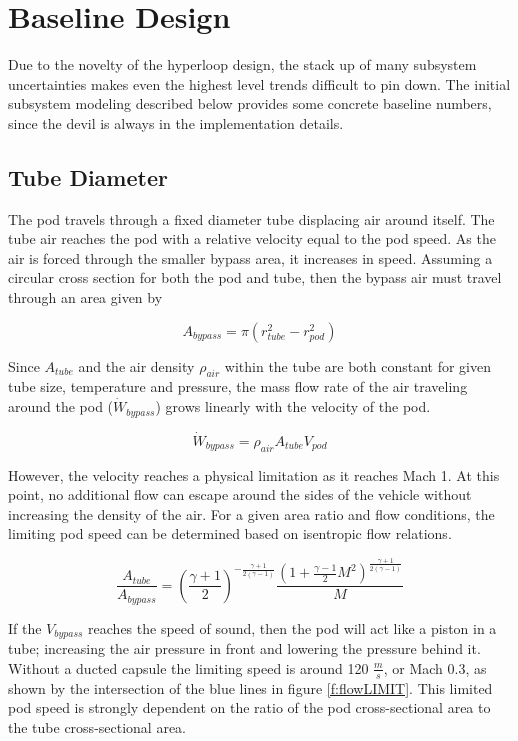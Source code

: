 \documentclass[heading.tex]{subfiles}
\begin{document}
\section{Baseline Design}


Due to the novelty of the hyperloop design, the stack up of many subsystem uncertainties makes even the highest level trends difficult to pin down.
The initial subsystem modeling described below provides some concrete baseline numbers, since the devil is always in the implementation details. 

\subsection{Tube Diameter}


	The pod travels through a fixed diameter tube displacing air around itself. The tube air reaches the
pod with a relative velocity equal to the pod speed. As the air is forced through the smaller bypass area, it increases in speed. Assuming a circular cross section for both the pod and tube, then the bypass air must travel through an area given by

\begin{equation*}
A_{bypass} = \pi(r_{tube}^2-r_{pod}^2)
\end{equation*}

Since $A_{tube}$ and the air density $\rho_{air}$ within the tube are both constant for given tube size, temperature and pressure, the mass flow rate of
the air traveling around the pod ($\dot{W}_{bypass}$) grows linearly with the velocity of the pod.

\begin{equation*}
\dot{W}_{bypass} = \rho_{air} A_{tube} V_{pod}
\end{equation*}

However, the velocity reaches a physical limitation as it reaches Mach 1. At this point, no additional flow can escape around the sides of the vehicle without
increasing the density of the air. For a given area ratio and flow conditions, the limiting pod speed can be determined based on isentropic flow relations.

\begin{equation*}
\frac{A_{tube}}{A_{bypass}} = \left(\frac{\gamma+1}{2}\right)^{-\frac{\gamma+1}{2\left(\gamma-1\right)}}\frac{\left(1+\frac{\gamma-1}{2}M^{2}\right)^{\frac{\gamma+1}{2\left(\gamma-1\right)}}}{M}
\end{equation*}


If the $V_{bypass}$ reaches the speed of sound, then the pod will act like a piston in a tube; increasing the air pressure in front
and lowering the pressure behind it. Without a ducted capsule the limiting speed is around 120 $\frac{m}{s}$, or Mach 0.3, as shown by the intersection of
the blue lines in figure \ref{f:flowLIMIT}. This limited pod speed is strongly dependent on the ratio of the pod cross-sectional area to the tube cross-sectional
area.
\end{document}
